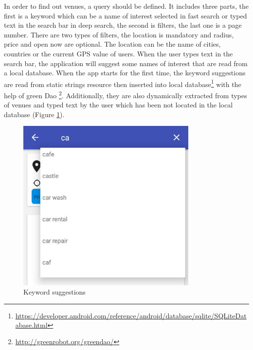 In order to find out venues, a query should be defined. It includes three parts, the first is a keyword which can be a name of interest selected in fast search or typed text in the search bar in deep search, the second is filters, the last one is a page number. There are two types of filters, the location is mandatory and radius, price and open now are optional. The location can be the name of cities, countries or the current GPS value of users.
When the user types text in the search bar, the application will suggest some names of interest that are read from a local database. When the app starts for the first time, the keyword suggestions  are read from static strings resource then inserted into local database\footnote{\url{https://developer.android.com/reference/android/database/sqlite/SQLiteDatabase.html}} with the help of green Dao \footnote{\url{http://greenrobot.org/greendao/}}. Additionally, they are also dynamically extracted from types of venues and typed text by the user which has been not located in the local database (Figure \ref{fig:keywordSuggestions}).
\begin{figure}[htbp]
	\includegraphics[width=0.8\textwidth]{images/suggestedkeywords.jpg}
	\centering
	\caption{Keyword suggestions}\label{fig:keywordSuggestions}
\end{figure} 

